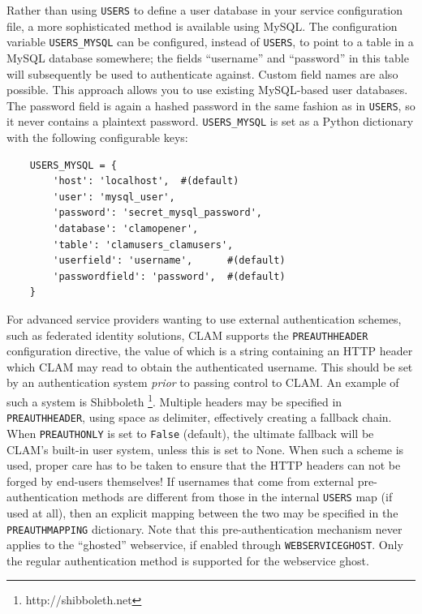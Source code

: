 \documentclass[a4paper,12pt]{report}
\begin{document}
Rather than using \texttt{USERS} to define a user database in your service
configuration file, a more sophisticated method is available using MySQL. The
configuration variable \texttt{USERS\_MYSQL} can be configured, instead of
\texttt{USERS}, to point to a table in a MySQL database somewhere; the fields
``username'' and ``password'' in this table will subsequently be used to
authenticate against. Custom field names are also possible. This approach
allows you to use existing MySQL-based user databases. The password field is
again a hashed password in the same fashion as in \texttt{USERS}, so it never
contains a plaintext password. \texttt{USERS\_MYSQL} is set as a Python
dictionary with the following configurable keys:

\begin{verbatim}
    USERS_MYSQL = {
        'host': 'localhost',  #(default)
        'user': 'mysql_user',        
        'password': 'secret_mysql_password',
        'database': 'clamopener',
        'table': 'clamusers_clamusers',
        'userfield': 'username',      #(default)
        'passwordfield': 'password',  #(default)
    }
\end{verbatim}

For advanced service providers wanting to use external authentication schemes,
such as federated identity solutions, CLAM supports the \texttt{PREAUTHHEADER}
configuration directive, the value of which is a string containing an HTTP
header which CLAM may read to obtain the authenticated username. This should be
set by an authentication system \emph{prior} to passing control to CLAM. An
example of such a system is Shibboleth \footnote{http://shibboleth.net}.
Multiple headers may be specified in \texttt{PREAUTHHEADER}, using space as
delimiter, effectively creating a fallback chain. When \texttt{PREAUTHONLY} is
set to \texttt{False} (default), the ultimate fallback will be CLAM's built-in
user system, unless this is set to None. When such a scheme is used, proper
care has to be taken to ensure that the HTTP headers can not be forged by
end-users themselves! If usernames that come from external pre-authentication
methods are different from those in the internal \texttt{USERS} map (if used at
all), then an explicit mapping between the two may be specified in the
\texttt{PREAUTHMAPPING} dictionary. Note that this pre-authentication mechanism
never applies to the ``ghosted'' webservice, if enabled through
\texttt{WEBSERVICEGHOST}. Only the regular authentication method is supported
for the webservice ghost.
\end{document}
